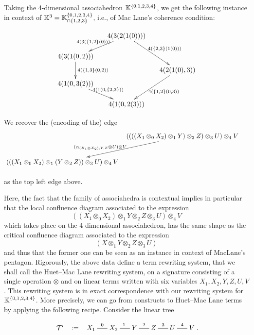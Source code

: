\begin{example} 
  \label{Huet-MacLane}
Taking the 4-dimensional associahedron ${\mathbb K}^{\left\{0,1,2,3,4\right\}}$, we get the following instance in context of ${\mathbb K}^3={\mathbb K}^{\left\{0,1,2,3,4\right\}}_{\cap \left\{1,2,3\right\}}$, i.e., of Mac Lane's coherence condition:
\begin{center}
$$\xymatrix @-1.65pc {&& 4(3(2(1(0)))) \ar @{->}[ddll]_{4(3(\set{1,2}(0)))} \ar @{->}[dddrr]^{4(\set{2,3}(1(0)))}&& \\
 &&&&\\
4(3(1(0,2)))  \ar @{->}[dd]^{4(\set{1,3}(0,2))}&&   && \\
 &&&&4(2(1(0),3)) \ar @{->}[dddll]^{4(\set{1,2}(0,3))}\\
 4(1(0,3(2))) \ar @{->}[ddrr]^{4(1(0,\set{2,3}))} &  &\\
 &&&&\\
 &&4(1(0,2(3)))&&}$$
\end{center}
We recover the (encoding of the) edge 
 $$
 \xymatrix @-2pc {&& ((((X_1\otimes_0 X_2)\otimes_1 Y)\otimes_2 Z)\otimes_3 U)\otimes_4 V \ar @{->}[dddddll]_(.6){(\alpha_{(X_1\otimes X_2),Y,Z}\otimes U)\otimes V\quad} && \\
 &&&&\\
 &&&&\\
  &&&&\\
    &&&&\\
( ((X_1\otimes_0 X_2)\otimes_1 (Y\otimes_2 Z))\otimes_3 U)\otimes_4 V  &&   && \\
\ }
$$
as the top left edge above.
\end{example}

Here, the fact that the family of associahedra is contextual implies in particular that the local confluence diagram associated to the expression
$$((X_1\otimes_0 X_2)\otimes_1 Y\otimes_2 Z\otimes_3 U)\otimes_4 V $$
which takes place on the $4$-dimensional associahedron, has the same shape as the critical confluence diagram associated to the expression
$$ (X \otimes_1 Y \otimes_2 Z \otimes_3 U)$$
and thus that the former one can be seen as an instance in context of MacLane's pentagon.  
Rigorously, the above data define a term rewriting system, that we shall call the Huet--Mac Lane rewriting system, on a signature consisting of a single operation $\otimes$ and on linear terms written with six variables  $X_1,X_2,Y,Z,U,V$. 
This rewriting system is in exact correspondence with our rewriting system for  ${\mathbb K}^{\left\{0,1,2,3,4\right\}}$. 
More precisely, we can go from constructs to  Huet--Mac Lane terms by applying the following recipe. 
Consider the linear tree 
\vspace{-.7cm}
\begin{center}
$$\xymatrix @-1.65pc {{\cal T}' & \eqdef  &X_1 \ar @{-}[rr]^{0}&& X_2 \ar @{-}[rr]^{1}&& Y \ar @{-}[rr]^{2}&& Z \ar @{-}[rr]^{3}&& U \ar @{-}[rr]^{4}&& V}.
  $$
\end{center}

